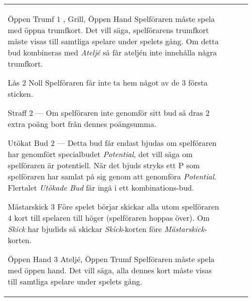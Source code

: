 \begin{table}
\begin{center}
\begin{tabularx}{\textwidth}{lcp{3cm}|X}
			\specialBidItem%
			{Öppen Trumf}
			{$1$}
			{\nonTrump, Grill, Öppen Hand}
			{%
				Spelföraren måste spela med öppna trumfkort. Det vill säga, spelförarens trumfkort måste visas till samtliga spelare under spelets gång. Om detta bud kombineras med \emph{Ateljé} så får ateljén inte innehålla några trumfkort.
			}

			\specialBidItem%
			{Lås}
			{$2$}
			{Noll}
			{%
				Spelföraren får inte ta hem något av de $3$ första sticken.
			}

			\specialBidItem%
			{Straff}
			{$2$}
			{---}
			{%
				Om spelföraren inte genomför sitt bud så dras $2$ extra poäng bort från dennes poängsumma.
			}

			\specialBidItem%
			{Utökat Bud}
			{$2$}
			{---}
			{%
				Detta bud får endast bjudas om spelföraren har genomfört specialbudet \emph{Potential}, det vill säga om spelföraren är potentiell. När det bjuds stryks ett P som spelföraren har samlat på sig genom att genomföra \emph{Potential}. Flertalet \emph{Utökade Bud} får ingå i ett kombinations-bud.
			}

			\specialBidItem%
			{Mästarskick}
			{$3$}
			{\nonTrump}
			{%
				Före spelet börjar skickar alla utom spelföraren $4$ kort till spelaren till höger (spelföraren hoppas över). Om \emph{Skick} har bjudids så skickar \emph{Skick}-korten före \emph{Mästarskick}-korten.
			}

			\specialBidItem%
			{Öppen Hand}
			{$3$}
			{Ateljé, Öppen Trumf}
			{%
				Spelföraren måste spela med öppen hand. Det vill säga, alla dennes kort måste visas till samtliga spelare under spelets gång.
			}
		\end{tabularx}
	\end{center}
\end{table}
